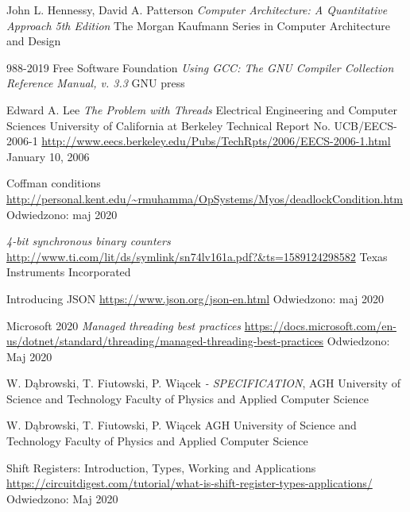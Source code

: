 \begin{thebibliography}{99}
        John L. Hennessy, David A. Patterson 
        \textit{Computer Architecture: A Quantitative Approach  5th Edition }
        The Morgan Kaufmann Series in Computer Architecture and Design

        988-2019 Free Software Foundation
        \textit{Using GCC: The GNU Compiler Collection Reference Manual, v. 3.3}
        GNU press

        Edward A. Lee
        \textit{The Problem with Threads}
        Electrical Engineering and Computer Sciences
        University of California at Berkeley
        Technical Report No. UCB/EECS-2006-1
        \url{http://www.eecs.berkeley.edu/Pubs/TechRpts/2006/EECS-2006-1.html}
        January 10, 2006

        Coffman conditions
        \url{http://personal.kent.edu/~rmuhamma/OpSystems/Myos/deadlockCondition.htm}
        Odwiedzono: maj 2020

        \textit{4-bit synchronous binary counters}
        \url{http://www.ti.com/lit/ds/symlink/sn74lv161a.pdf?&ts=1589124298582}
        Texas Instruments Incorporated
        

        Introducing JSON
        \url{https://www.json.org/json-en.html}
        Odwiedzono: maj 2020

        Microsoft 2020
        \textit{Managed threading best practices}
        \url{https://docs.microsoft.com/en-us/dotnet/standard/threading/managed-threading-best-practices}
        Odwiedzono: Maj 2020
        
	    W. Dąbrowski, T. Fiutowski, P. Wiącek 
	    \textit{ - SPECIFICATION},
	    AGH University of Science and Technology
        Faculty of Physics and Applied Computer Science 

	    W. Dąbrowski, T. Fiutowski, P. Wiącek 
        \textit{}
        AGH University of Science and Technology
        Faculty of Physics and Applied Computer Science 

        Shift Registers: Introduction, Types, Working and Applications
        \url{https://circuitdigest.com/tutorial/what-is-shift-register-types-applications/}
        Odwiedzono: Maj 2020


\end{thebibliography}
